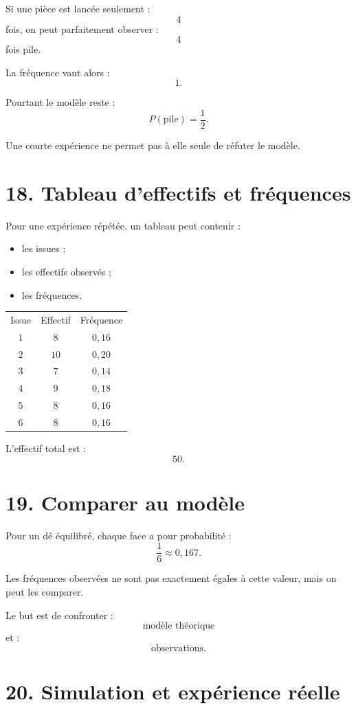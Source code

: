 Si une pièce est lancée seulement :
\[
4
\]
fois, on peut parfaitement observer :
\[
4
\]
fois pile.

La fréquence vaut alors :
\[
1.
\]

Pourtant le modèle reste :
\[
P(\text{pile})=\dfrac12.
\]

Une courte expérience ne permet pas à elle seule de réfuter le modèle.

\section{18. Tableau d'effectifs et fréquences}

Pour une expérience répétée, un tableau peut contenir :
\begin{itemize}
\item les issues ;
\item les effectifs observés ;
\item les fréquences.
\end{itemize}

\begin{tabular}{c|c|c}
Issue & Effectif & Fréquence \\
$1$ & $8$ & $0{,}16$ \\
$2$ & $10$ & $0{,}20$ \\
$3$ & $7$ & $0{,}14$ \\
$4$ & $9$ & $0{,}18$ \\
$5$ & $8$ & $0{,}16$ \\
$6$ & $8$ & $0{,}16$ \\
\end{tabular}

L'effectif total est :
\[
50.
\]

\section{19. Comparer au modèle}

Pour un dé équilibré, chaque face a pour probabilité :
\[
\dfrac16\approx0{,}167.
\]

Les fréquences observées ne sont pas exactement égales à cette valeur, mais on peut les comparer.

Le but est de confronter :
\[
\text{modèle théorique}
\]
et :
\[
\text{observations}.
\]

\section{20. Simulation et expérience réelle}

